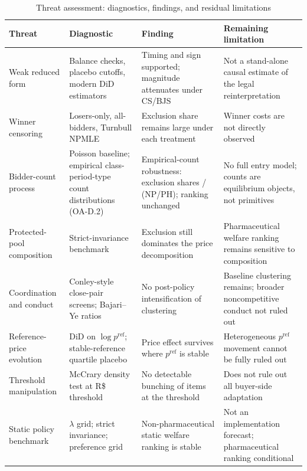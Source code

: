 \begin{table}[!htbp]
\centering
\begin{threeparttable}
\caption{Threat assessment: diagnostics, findings, and residual limitations}
\label{tab:threat_assessment_v8}
\scriptsize
\setlength{\tabcolsep}{3pt}
\renewcommand{\arraystretch}{1.15}
\begin{tabular}{>{\raggedright\arraybackslash}p{}>{\raggedright\arraybackslash}p{}>{\raggedright\arraybackslash}p{}>{\raggedright\arraybackslash}p{}}
\toprule
Threat & Diagnostic & Finding & Remaining limitation \\
\midrule
Weak reduced form
  & Balance checks, placebo cutoffs, modern DiD estimators
  & Timing and sign supported; magnitude attenuates under CS/BJS
  & Not a stand-alone causal estimate of the legal reinterpretation \\
Winner censoring
  & Losers-only, all-bidders, Turnbull NPMLE
  & Exclusion share remains large under each treatment
  & Winner costs are not directly observed \\
Bidder-count process
  & Poisson baseline; empirical class-period-type count distributions (OA-D.2)
  & Empirical-count robustness: exclusion shares \bneEffEmpShareNp{}/\bneEffEmpSharePh{} (NP/PH); ranking unchanged
  & No full entry model; counts are equilibrium objects, not primitives \\
Protected-pool composition
  & Strict-invariance benchmark
  & Exclusion still dominates the price decomposition
  & Pharmaceutical welfare ranking remains sensitive to composition \\
Coordination and conduct
  & Conley-style close-pair screens; Bajari--Ye ratios
  & No post-policy intensification of clustering
  & Baseline clustering remains; broader noncompetitive conduct not ruled out \\
Reference-price evolution
  & DiD on $\log p^{\mathrm{ref}}$; stable-reference quartile placebo
  & Price effect survives where $p^{\mathrm{ref}}$ is stable
  & Heterogeneous $p^{\mathrm{ref}}$ movement cannot be fully ruled out \\
Threshold manipulation
  & McCrary density test at R\$\,\setAsideThreshBRL{} threshold
  & No detectable bunching of items at the threshold
  & Does not rule out all buyer-side adaptation \\
Static policy benchmark
  & $\lambda$ grid; strict invariance; preference grid
  & Non-pharmaceutical static welfare ranking is stable
  & Not an implementation forecast; pharmaceutical ranking conditional \\

\end{tabular}
\end{threeparttable}
\end{table}
